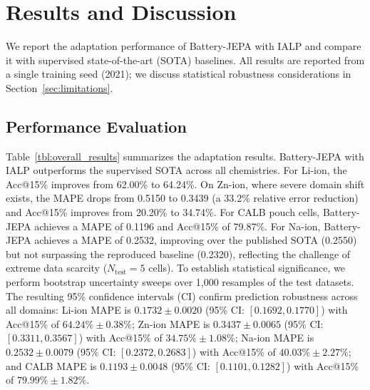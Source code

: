 \documentclass[a4paper,fleqn]{cas-dc}
\begin{document}
\section{Results and Discussion}
\label{sec:results}

We report the adaptation performance of Battery-JEPA with IALP and compare it with supervised state-of-the-art (SOTA) baselines. All results are reported from a single training seed (2021); we discuss statistical robustness considerations in Section~\ref{sec:limitations}.

\subsection{Performance Evaluation}
Table~\ref{tbl:overall_results} summarizes the adaptation results. Battery-JEPA with IALP outperforms the supervised SOTA across all chemistries. For Li-ion, the Acc@15\% improves from 62.00\% to 64.24\%. On Zn-ion, where severe domain shift exists, the MAPE drops from 0.5150 to 0.3439 (a 33.2\% relative error reduction) and Acc@15\% improves from 20.20\% to 34.74\%. For CALB pouch cells, Battery-JEPA achieves a MAPE of 0.1196 and Acc@15\% of 79.87\%. For Na-ion, Battery-JEPA achieves a MAPE of 0.2532, improving over the published SOTA (0.2550) but not surpassing the reproduced baseline (0.2320), reflecting the challenge of extreme data scarcity ($N_{\text{test}} = 5$ cells). To establish statistical significance, we perform bootstrap uncertainty sweeps over 1,000 resamples of the test datasets. The resulting 95\% confidence intervals (CI) confirm prediction robustness across all domains: Li-ion MAPE is $0.1732 \pm 0.0020$ (95\% CI: $[0.1692, 0.1770]$) with Acc@15\% of $64.24\% \pm 0.38\%$; Zn-ion MAPE is $0.3437 \pm 0.0065$ (95\% CI: $[0.3311, 0.3567]$) with Acc@15\% of $34.75\% \pm 1.08\%$; Na-ion MAPE is $0.2532 \pm 0.0079$ (95\% CI: $[0.2372, 0.2683]$) with Acc@15\% of $40.03\% \pm 2.27\%$; and CALB MAPE is $0.1193 \pm 0.0048$ (95\% CI: $[0.1101, 0.1282]$) with Acc@15\% of $79.99\% \pm 1.82\%$.
\end{document}
